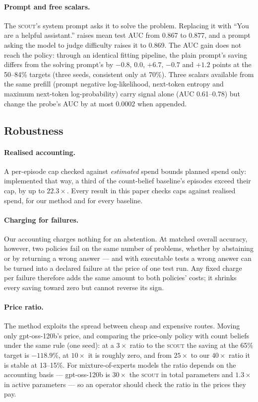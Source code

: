 \documentclass[10pt]{article} %
\newcommand{\scout}{\textsc{scout}\xspace}
\begin{document}
\paragraph{Prompt and free scalars.}
The \scout's system prompt asks it to solve the problem.  Replacing it with ``You are a helpful
assistant.'' raises mean test AUC from 0.867 to 0.877, and a prompt asking the model to judge
difficulty raises it to 0.869.  The AUC gain does not reach the policy: through an identical
fitting pipeline, the plain prompt's saving differs from the solving prompt's by $-0.8$, $0.0$,
$+6.7$, $-0.7$ and $+1.2$ points at the 50--84\% targets (three seeds, consistent only at 70\%).
Three scalars available from the same prefill (prompt negative log-likelihood, next-token entropy
and maximum next-token log-probability) carry signal alone (AUC 0.61--0.78) but change the
probe's AUC by at most 0.0002 when appended.

\subsection{Robustness}
\label{sec:robust}

\paragraph{Realised accounting.}
A per-episode cap checked against \emph{estimated} spend bounds planned spend only: implemented
that way, a third of the count-belief baseline's episodes exceed their cap, by up to
$22.3\times$.  Every result in this paper checks caps against realised spend, for our method and
for every baseline.

\paragraph{Charging for failures.}
Our accounting charges nothing for an abstention.  At matched overall accuracy, however, two
policies fail on the same number of problems, whether by abstaining or by returning a wrong answer
--- and with executable tests a wrong answer can be turned into a declared failure at the price of
one test run.  Any fixed charge per failure therefore adds the same amount to both policies'
costs; it shrinks every saving toward zero but cannot reverse its sign.

\paragraph{Price ratio.}
The method exploits the spread between cheap and expensive routes.  Moving only gpt-oss-120b's
price, and comparing the price-only policy with count beliefs under the same rule (one seed): at
a $3\times$ ratio to the \scout the saving at the 65\% target is $-118.9\%$, at $10\times$ it is
roughly zero, and from $25\times$ to our $40\times$ ratio it is stable at 13--15\%.  For
mixture-of-experts models the ratio depends on the accounting basis --- gpt-oss-120b is $30\times$
the \scout in total parameters and $1.3\times$ in active parameters --- so an operator should check
the ratio in the prices they pay.
\end{document}
